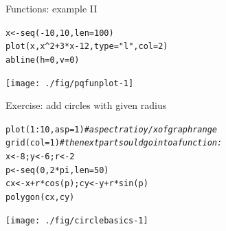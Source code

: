 \documentclass[xcolor=table,           xcolor=dvipsnames]{beamer}\usepackage[]{graphicx}\usepackage[]{color}
\makeatletter
\newcommand{\hlnum}[1]{\textcolor[rgb]{0,0,0}{#1}}
\newcommand{\hlstr}[1]{\textcolor[rgb]{0.545,0.137,0.137}{#1}}
\newcommand{\hlcom}[1]{\textcolor[rgb]{0,0.392,0}{\textit{#1}}}
\newcommand{\hlopt}[1]{\textcolor[rgb]{0,0,0}{#1}}
\newcommand{\hlstd}[1]{\textcolor[rgb]{0,0,0}{#1}}
\newcommand{\hlkwb}[1]{\textcolor[rgb]{0,0,0}{#1}}
\newcommand{\hlkwc}[1]{\textcolor[rgb]{1,0,1}{#1}}
\newcommand{\hlkwd}[1]{\textcolor[rgb]{0,0,1}{#1}}
\newenvironment{kframe}{%
 \def\at@end@of@kframe{}%
 \ifinner\ifhmode%
  \def\at@end@of@kframe{\end{minipage}}%
  \begin{minipage}{\columnwidth}%
 \fi\fi%
 \def\FrameCommand##1{\hskip\@totalleftmargin \hskip-\fboxsep
 \colorbox{shadecolor}{##1}\hskip-\fboxsep
     \hskip-\linewidth \hskip-\@totalleftmargin \hskip\columnwidth}%
 \MakeFramed {\advance\hsize-\width
   \@totalleftmargin\z@ \linewidth\hsize
   \@setminipage}}%
 {\par\unskip\endMakeFramed%
 \at@end@of@kframe}
\newenvironment{knitrout}{}{} %
\makeatother
\begin{document}

\begin{frame}[fragile]{Functions: example II}
\begin{knitrout}
\color{fgcolor}\begin{kframe}
\begin{alltt}
\hlstd{x} \hlkwb{<-} \hlkwd{seq}\hlstd{(}\hlopt{-}\hlnum{10}\hlstd{,} \hlnum{10}\hlstd{,} \hlkwc{len}\hlstd{=}\hlnum{100}\hlstd{)}
\hlkwd{plot}\hlstd{(x,  x}\hlopt{^}\hlnum{2} \hlopt{+}\hlnum{3}\hlopt{*}\hlstd{x} \hlopt{-}\hlnum{12}\hlstd{,} \hlkwc{type}\hlstd{=}\hlstr{"l"}\hlstd{,} \hlkwc{col}\hlstd{=}\hlnum{2}\hlstd{)}
\hlkwd{abline}\hlstd{(}\hlkwc{h}\hlstd{=}\hlnum{0}\hlstd{,} \hlkwc{v}\hlstd{=}\hlnum{0}\hlstd{)}
\end{alltt}
\end{kframe}

{\centering \texttt{[image: ./fig/pqfunplot-1]} 

}



\end{knitrout}
\end{frame}


\begin{frame}[fragile]{Exercise: add circles with given radius}
\begin{knitrout}
\color{fgcolor}\begin{kframe}
\begin{alltt}
\hlkwd{plot}\hlstd{(}\hlnum{1}\hlopt{:}\hlnum{10}\hlstd{,} \hlkwc{asp}\hlstd{=}\hlnum{1}\hlstd{)} \hlcom{# aspect ratio y/x of graph range}
\hlkwd{grid}\hlstd{(}\hlkwc{col}\hlstd{=}\hlnum{1}\hlstd{)} \hlcom{# the next part sould go into a function:}
\hlstd{x} \hlkwb{<-} \hlnum{8} \hlstd{;  y} \hlkwb{<-} \hlnum{6} \hlstd{;  r} \hlkwb{<-}\hlnum{2}
\hlstd{p} \hlkwb{<-} \hlkwd{seq}\hlstd{(}\hlnum{0}\hlstd{,} \hlnum{2}\hlopt{*}\hlstd{pi,} \hlkwc{len}\hlstd{=}\hlnum{50}\hlstd{)}
\hlstd{cx} \hlkwb{<-} \hlstd{x}\hlopt{+}\hlstd{r}\hlopt{*}\hlkwd{cos}\hlstd{(p) ;  cy} \hlkwb{<-} \hlstd{y}\hlopt{+}\hlstd{r}\hlopt{*}\hlkwd{sin}\hlstd{(p)}
\hlkwd{polygon}\hlstd{(cx, cy)}
\end{alltt}
\end{kframe}

{\centering \texttt{[image: ./fig/circlebasics-1]} 

}



\end{knitrout}
\end{frame}
\end{document}

